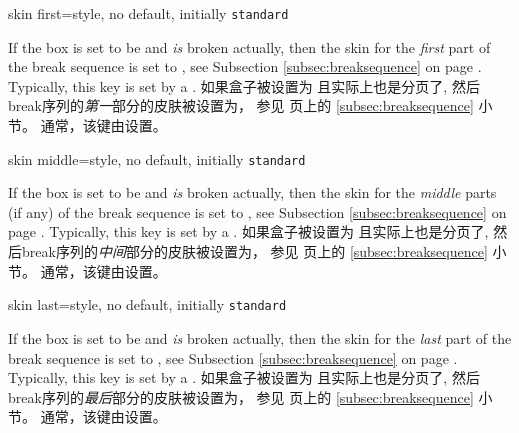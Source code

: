 \begin{docTcbKey}{skin first}{=}{style, no default, initially \texttt{standard}}
\begin{stripedbox}
If the box is set to be  and \emph{is} broken actually,
then the skin for the \emph{first} part of the break sequence
is set to , see Subsection \ref{subsec:breaksequence} on page \pageref{subsec:breaksequence}.
Typically, this key is set by a .
\tcblower
如果盒子被设置为 且实际上也是分页了,%
然后break序列的\emph{第一}部分的皮肤被设置为，
参见 \pageref{subsec:breaksequence} 页上的 \ref{subsec:breaksequence} 小节。
通常，该键由设置。
\end{stripedbox}
\end{docTcbKey}


\begin{docTcbKey}{skin middle}{=}{style, no default, initially \texttt{standard}}
\begin{stripedbox}
If the box is set to be  and \emph{is} broken actually,
then the skin for the \emph{middle} parts (if any) of the break sequence
is set to , see Subsection \ref{subsec:breaksequence} on page \pageref{subsec:breaksequence}.
Typically, this key is set by a .
\tcblower
如果盒子被设置为 且实际上也是分页了,%
然后break序列的\emph{中间}部分的皮肤被设置为，
参见 \pageref{subsec:breaksequence} 页上的 \ref{subsec:breaksequence} 小节。
通常，该键由设置。
\end{stripedbox}
\end{docTcbKey}


\begin{docTcbKey}{skin last}{=}{style, no default, initially \texttt{standard}}
\begin{stripedbox}
If the box is set to be  and \emph{is} broken actually,
then the skin for the \emph{last} part of the break sequence
is set to , see Subsection \ref{subsec:breaksequence} on page \pageref{subsec:breaksequence}.
Typically, this key is set by a .
\tcblower
如果盒子被设置为 且实际上也是分页了,%
然后break序列的\emph{最后}部分的皮肤被设置为，
参见 \pageref{subsec:breaksequence} 页上的 \ref{subsec:breaksequence} 小节。
通常，该键由设置。
\end{stripedbox}
\end{docTcbKey}

